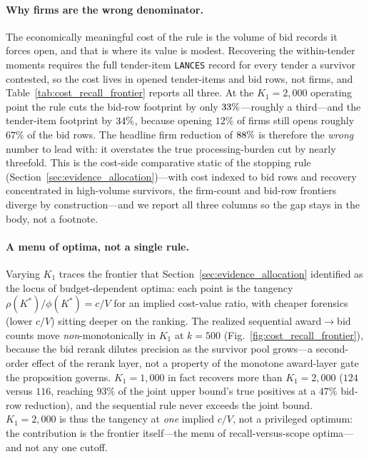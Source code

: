\paragraph{Why firms are the wrong denominator.}
The economically meaningful cost of the rule is the volume of bid
records it forces open, and that is where its value is modest.
Recovering the within-tender moments requires the full tender-item
\texttt{LANCES} record for every tender a survivor contested, so the
cost lives in opened tender-items and bid rows, not firms, and
Table~\ref{tab:cost_recall_frontier} reports all three. At the
$K_1=2{,}000$ operating point the rule cuts the bid-row footprint by
only $33\%$---roughly a third---and the tender-item
footprint by $34\%$, because opening $12\%$ of firms
still opens roughly $67\%$ of the bid rows. The headline firm reduction
of $88\%$ is therefore the \emph{wrong} number to lead
with: it overstates the true processing-burden cut by nearly threefold.
This is the cost-side comparative static of the stopping rule
(Section~\ref{sec:evidence_allocation})---with cost indexed to bid rows
and recovery concentrated in high-volume survivors, the firm-count and
bid-row frontiers diverge by construction---and we report all three
columns so the gap stays in the body, not a footnote.

\paragraph{A menu of optima, not a single rule.}
Varying $K_1$ traces the frontier that Section~\ref{sec:evidence_allocation}
identified as the locus of budget-dependent optima: each point is the
tangency $\rho(K^{*})/\phi(K^{*}) = c/V$ for an implied cost-value
ratio, with cheaper forensics (lower $c/V$) sitting deeper on the
ranking. The realized sequential award$\rightarrow$bid counts move
\emph{non}-monotonically in $K_1$ at $k=500$
(Fig.~\ref{fig:cost_recall_frontier}), because the bid rerank dilutes
precision as the survivor pool grows---a second-order effect of the
rerank layer, not a property of the monotone award-layer gate the
proposition governs. $K_1=1{,}000$ in fact recovers more than
$K_1=2{,}000$ ($124$ versus $116$, reaching $93\%$ of the joint upper
bound's true positives at a $47\%$ bid-row reduction), and the
sequential rule never exceeds the joint bound. $K_1=2{,}000$ is thus
the tangency at \emph{one} implied $c/V$, not a privileged optimum: the
contribution is the frontier itself---the menu of recall-versus-scope
optima---and not any one cutoff.

